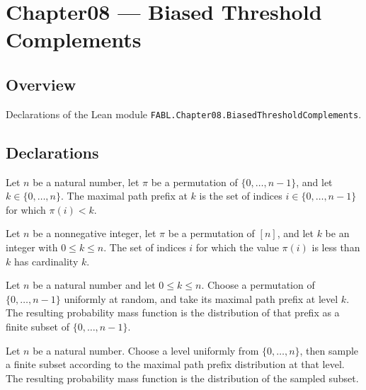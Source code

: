 \chapter{Chapter08 — Biased Threshold Complements}
\section{Overview}

Declarations of the Lean module \texttt{FABL.Chapter08.BiasedThresholdComplements}.

\section{Declarations}

\begin{definition}
\label{FABL.maximalPathPrefix}
\leanok
Let $n$ be a natural number, let $\pi$ be a permutation of $\{0,\ldots,n-1\}$, and let
$k\in\{0,\ldots,n\}$. The maximal path prefix at $k$ is the set of indices
$i\in\{0,\ldots,n-1\}$ for which $\pi(i)<k$.
\end{definition}

\begin{theorem}
\label{FABL.card_maximalPathPrefix}
\leanok
{}
Let $n$ be a nonnegative integer, let $\pi$ be a permutation of $[n]$, and let $k$ be an
integer with $0\le k\le n$. The set of indices $i$ for which the value $\pi(i)$ is less
than $k$ has cardinality $k$.
\end{theorem}

\begin{definition}
\label{FABL.maximalPathLayerPMF}
\leanok
{}
Let $n$ be a natural number and let $0\le k\le n$. Choose a permutation of
$\{0,\ldots,n-1\}$ uniformly at random, and take its maximal path prefix at level $k$.
The resulting probability mass function is the distribution of that prefix as a finite
subset of $\{0,\ldots,n-1\}$.
\end{definition}

\begin{definition}
\label{FABL.uniformMaximalPathPointPMF}
\leanok
{}
Let $n$ be a natural number. Choose a level uniformly from $\{0,\ldots,n\}$, then sample
a finite subset according to the maximal path prefix distribution at that level. The
resulting probability mass function is the distribution of the sampled subset.
\end{definition}

